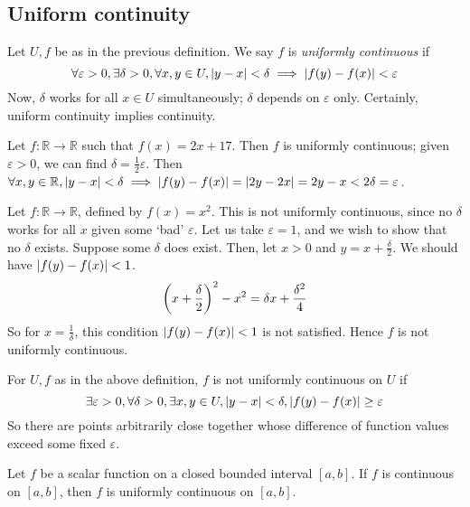\subsection{Uniform continuity}
\begin{definition}
	Let \( U, f \) be as in the previous definition.
	We say \( f \) is \textit{uniformly continuous} if
	\[
		\forall \varepsilon > 0, \exists \delta > 0, \forall x, y \in U, \abs{y-x} < \delta \implies \abs{f(y) - f(x)} < \varepsilon
	\]
	Now, \( \delta \) works for all \( x \in U \) simultaneously; \( \delta \) depends on \( \varepsilon \) only.
	Certainly, uniform continuity implies continuity.
\end{definition}
\begin{example}
	Let \( f \colon \mathbb R \to \mathbb R \) such that \( f(x) = 2x + 17 \).
	Then \( f \) is uniformly continuous; given \( \varepsilon > 0 \), we can find \( \delta = \frac{1}{2} \varepsilon \).
	Then \( \forall x, y \in \mathbb R, \abs{y-x} < \delta \implies \abs{f(y)-f(x)} = \abs{2y-2x} = 2{y-x} < 2 \delta = \varepsilon \).
\end{example}
\begin{example}
	Let \( f \colon \mathbb R \to \mathbb R \), defined by \( f(x) = x^2 \).
	This is not uniformly continuous, since no \( \delta \) works for all \( x \) given some `bad' \( \varepsilon \).
	Let us take \( \varepsilon = 1 \), and we wish to show that no \( \delta \) exists.
	Suppose some \( \delta \) does exist.
	Then, let \( x > 0 \) and \( y = x + \frac{\delta}{2} \).
	We should have \( \abs{f(y) - f(x)} < 1 \).
	\[
		\qty(x + \frac{\delta}{2})^2 - x^2 = \delta x + \frac{\delta^2}{4}
	\]
	So for \( x = \frac{1}{\delta} \), this condition \( \abs{f(y) - f(x)} < 1 \) is not satisfied.
	Hence \( f \) is not uniformly continuous.
\end{example}
\begin{note}
	For \( U, f \) as in the above definition, \( f \) is not uniformly continuous on \( U \) if
	\[
		\exists \varepsilon > 0, \forall \delta > 0, \exists x, y \in U, \abs{y-x} < \delta, \abs{f(y) - f(x)} \geq \varepsilon
	\]
	So there are points arbitrarily close together whose difference of function values exceed some fixed \( \varepsilon \).
\end{note}
\begin{theorem}
	Let \( f \) be a scalar function on a closed bounded interval \( [a,b] \).
	If \( f \) is continuous on \( [a,b] \), then \( f \) is uniformly continuous on \( [a,b] \).
\end{theorem}
